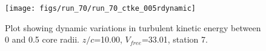 \begin{figure}[H]
\centering
\texttt{[image: figs/run\_70/run\_70\_ctke\_005rdynamic]}
\caption{Plot showing dynamic variations in turbulent kinetic energy between 0 and 0.5 core radii. $z/c$=10.00, $V_{free}$=33.01, station 7.}
\end{figure}


